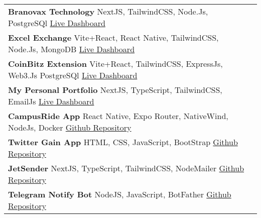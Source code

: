 \documentclass{article}
\newcommand{\sectionnumber}[1]{\textbf{#1}}
\newcommand{\contactinfo}[1]{{\fontsize{12pt}{14pt}\selectfont\color{black!70}#1}}
\newcommand{\sectiondivider}[2][0.4]{%
    \noindent
    \vspace{3pt}
    \textcolor{black}{%
        \noindent
        \makebox[\linewidth]{\rule{#1\linewidth}{0.5pt}%
        \hspace{5pt} \textbf{\uppercase{#2}} \hspace{5pt}%
        \rule{#1\linewidth}{0.5pt}}%
    }
    \vspace{3pt}
}
\begin{document}
\vspace{0.5cm}

\sectiondivider[0.46]{Projects} \\
\noindent
\begin{tabular}{p{} r}
    \sectionnumber{\large{Branovax Technology}} \textbar{} NextJS, TailwindCSS, Node.Js, PostgreSQl \textbar{} \contactinfo{ \href{https://branovax.com}{Live Dashboard}} \\[0.4cm]
    \sectionnumber{\large{Excel Exchange}} \textbar{} Vite+React, React Native, TailwindCSS, Node.Js, MongoDB \textbar{} \contactinfo{ \href{https://excelexchange.vercel.app}{Live Dashboard}} \\[0.4cm]
    \sectionnumber{\large{CoinBitz Extension}} \textbar{} Vite+React, TailwindCSS, ExpressJs, Web3.Js PostgreSQl \textbar{} \contactinfo{ \href{https://coinbit-extension.vercel.app}{Live Dashboard}} \\[0.4cm]
    \sectionnumber{\large{My Personal Portfolio}} \textbar{} NextJS, TypeScript, TailwindCSS, EmailJs \textbar{} \contactinfo{ \href{https://hadiademola.vercel.app}{Live Dashboard}} \\[0.4cm]
    \sectionnumber{\large{CampusRide App}} \textbar{} React Native, Expo Router, NativeWind, NodeJs, Docker \textbar{} \contactinfo{ \href{https://github.com/Hardeygold205/CampusRide}{Github Repository}} \\[0.4cm]
    \sectionnumber{\large{Twitter Gain App}} \textbar{} HTML, CSS, JavaScript, BootStrap \textbar{} \contactinfo{ \href{https://github.com/Hardeygold205/twitter-gain-app}{Github Repository}} \\[0.4cm]
    \sectionnumber{\large{JetSender}} \textbar{} NextJS, TypeScript, TailwindCSS, NodeMailer \textbar{} \contactinfo{ \href{https://github.com/Hardeygold205/BulkEMailSender}{Github Repository}} \\[0.4cm]
    \sectionnumber{\large{Telegram Notify Bot}} \textbar{} NodeJS, JavaScript, BotFather \textbar{} \contactinfo{ \href{https://github.com/Hardeygold205/NottifyBot}{Github Repository}} \\
\end{tabular}

\vspace{0.1cm}

\newpage
\end{document}
